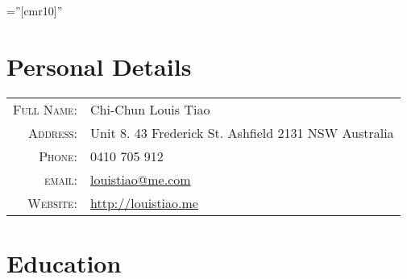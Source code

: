 \documentclass[a4paper,10pt]{article} %
\begin{document}
\pagestyle{empty} %

\font\fb=''[cmr10]'' %


\par{\bigskip\par} %

\section{Personal Details}

\begin{tabular}{rl}
  \textsc{Full Name:} & Chi-Chun Louis Tiao \\
  \textsc{Address:}   & Unit 8. 43 Frederick St. Ashfield 2131 NSW Australia \\
  \textsc{Phone:}     & 0410 705 912 \\
  \textsc{email:}     & \href{mailto:louistiao@me.com}{louistiao@me.com} \\
  \textsc{Website:}   & \href{http://louistiao.me}{http://louistiao.me} 
\end{tabular}


\section{Education}
\end{document}
